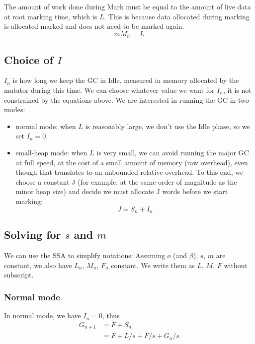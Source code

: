 \documentclass{article}
\begin{document}
The amount of work done during Mark must be equal to the amount of
live data at root marking time, which is $L$. This is because data
allocated during marking is allocated marked and does not need to be
marked again.
\begin{equation}\label{eqn-mM}
mM_n = L
\end{equation}

\subsection[Choice of I]{Choice of $I$}

$I_n$ is how long we keep the GC in Idle, measured in memory allocated
by the mutator during this time. We can choose whatever value we want
for $I_n$, it is not constrained by the equations above. We are
interested in running the GC in two modes:
\begin{itemize}
\item normal mode: when $L$ is reasonably large, we don't use the Idle
phase, so we set $I_n = 0$.
\item small-heap mode: when $L$ is very small,  we can avoid running
the major GC at full speed, at the cost of a small amount of memory
(raw overhead), even though that translates to an unbounded relative
overhead. To this end, we choose a constant J (for example, at the
same order of magnitude as the minor heap size) and decide we must
allocate J words before we start marking:
\begin{equation}\label{def-J}
  J = S_n + I_n
\end{equation}
\end{itemize}

\subsection[Solving for s and m]{Solving for $s$ and $m$}

We can use the SSA to simplify notations: Assuming $o$ (and $\beta$),
$s$, $m$ are constant, we also have $L_n$, $M_n$, $F_n$ constant. We
write them as $L$, $M$, $F$ without subscript.

\subsubsection{Normal mode}

In normal mode, we have $I_n = 0$, thus
\begin{equation}
\begin{split}
G_{n+1} & = F + S_n \\
        & = F + L/s + F/s + G_n/s
\end{split}
\end{equation}
\end{document}
